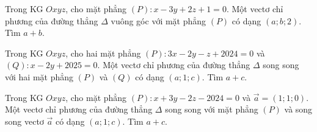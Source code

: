 \begin{ex}%
	Trong KG $Oxyz$, cho mặt phẳng $(P) \colon x-3y+2z+1=0$.  Một vectơ chỉ phương của đường thẳng $\Delta $ vuông góc với mặt phẳng $\left( P \right)$ có dạng $(a;b;2)$. Tìm $a+b$.
\end{ex}


\begin{ex}%
	Trong KG $Oxyz$, cho hai mặt phẳng $( P) \colon 3x-2y-z+2024=0$ và $(Q) \colon x-2y+2025=0$. Một vectơ chỉ phương của đường thẳng $\Delta $ song song với hai mặt phẳng $\left( P \right)$ và $\left( Q \right)$ có dạng $(a;1;c)$. Tìm $a+c$.
\end{ex}
\begin{ex}%
	Trong KG $Oxyz$, cho mặt phẳng $(P) \colon x+3y-2z-2024=0$ và $\overrightarrow{a}=\left( 1;1;0 \right)$. Một vectơ chỉ phương của đường thẳng $\Delta $ song song với mặt phẳng $(P)$ và song song vectơ $\overrightarrow{a}$ có dạng $(a;1;c)$. Tìm $a+c$.
\end{ex}
